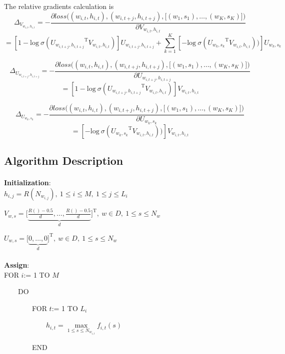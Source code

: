 \documentclass[12pt,a4paper,twoside]{book}
\begin{document}
The relative gradients calculation is
$$\Delta_{V_{w_{i,t},h_{i,t}}} = -\frac{\partial loss\bigg ( (w_{i,t},h_{i,t}),(w_{i,t+j},h_{i,t+j}),\big [(w_1,s_1),\ldots,(w_K,s_K)\big ]\bigg )}{\partial V_{w_{i,t},h_{i,t}}} $$
$$= [1-\mathrm{log}\ \sigma({U_{w_{i,t+j},h_{i,t+j}}}^{\mathrm{T}}V_{w_{i,t},h_{i,t}})]
U_{w_{i,t+j},h_{i,t+j}}+\sum_{k=1}^K [-\mathrm{log}\ \sigma({U_{w_k,s_k}}^{\mathrm{T}}V_{w_{i,t},h_{i,t}}))]U_{w_k,s_k}$$

$$\Delta_{U_{w_{i,t+j},h_{i,t+j}}} = -\frac{\partial loss\bigg ( (w_{i,t},h_{i,t}),(w_{i,t+j},h_{i,t+j}),\big [(w_1,s_1),\ldots,(w_K,s_K)\big ]\bigg )}{\partial U_{w_{i,t+j},h_{i,t+j}}}$$
$$=[1-\mathrm{log}\ \sigma({U_{w_{i,t+j},h_{i,t+j}}}^{\mathrm{T}}V_{w_{i,t},h_{i,t}})]
V_{w_{i,t},h_{i,t}}$$

$$\Delta_{U_{w_k,s_k}} = -\frac{\partial loss\bigg ( (w_{i,t},h_{i,t}),(w_{i,t+j},h_{i,t+j}),\big [(w_1,s_1),\ldots,(w_K,s_K)\big ]\bigg )}{\partial U_{w_k,s_k}}$$
$$=[-\mathrm{log}\ \sigma({U_{w_k,s_k}}^{\mathrm{T}}V_{w_{i,t},h_{i,t}}))]V_{w_{i,t},h_{i,t}}$$

\subsection{Algorithm Description}
\paragraph{} \textbf{Initialization}: \\

$h_{i,j} = R(N_{w_{i,j}}),  \ 1\leq i \leq M,  \ 1\leq j\leq L_i$

$V_{w,s} = \Big[\underbrace{\frac{R()-0.5}{d},\ldots,\frac{R()-0.5}{d}}_{d}\Big]^{\mathrm{T}}, \ w\in D, \  1\leq s\leq N_w$

$U_{w,s} = \Big[\underbrace{0,\ldots,0}_{d}\Big]^{\mathrm{T}},  \ w\in D, \  1\leq s\leq N_w$
\paragraph{} \textbf{Assign}:\\

FOR $i$:= 1 TO $M$

\ \ \ \ DO

\ \ \ \ \ \ \ \ FOR $t$:= 1 TO $L_i$

\ \ \ \ \ \ \ \ \ \ \ \ $h_{i,t} = \max\limits_{1\leq s\leq N_{w_{i,t}}} f_{i,t}(s)$

\ \ \ \ \ \ \ \ END
\end{document}
